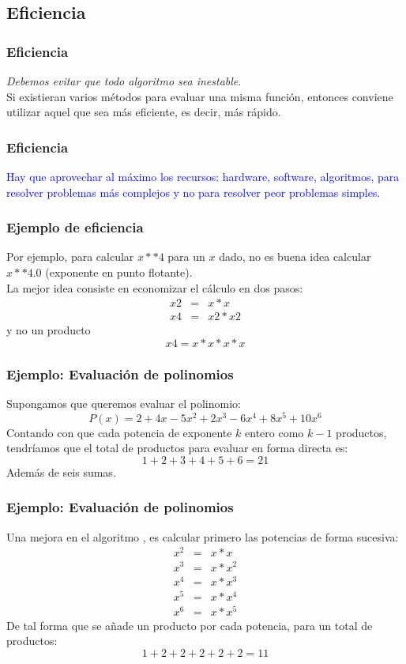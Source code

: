 \subsection{Eficiencia}
\begin{frame}
\frametitle{Eficiencia}
\emph{Debemos evitar que todo algoritmo sea inestable}. 
\\
\bigskip
Si existieran varios métodos para evaluar una misma función, entonces conviene utilizar aquel que sea más eficiente, es decir, más rápido.
\end{frame}
\begin{frame}
\frametitle{Eficiencia}
\textcolor{blue}{Hay que aprovechar al máximo los recursos: hardware, software, algoritmos, para resolver problemas más complejos y no para resolver peor problemas simples.}
\end{frame}
\begin{frame}
\frametitle{Ejemplo de eficiencia}
Por ejemplo, para calcular $x**4$ para un $x$ dado, no es buena idea calcular $x**4.0$ (exponente en punto flotante).
\\
\bigskip
\pause
La mejor idea consiste en economizar el cálculo en dos pasos:
\begin{eqnarray*}
x2 &=& x*x \\
x4 &=& x2*x2
\end{eqnarray*}
y no un producto 
\[ x4=x*x*x*x \]
\end{frame}
\begin{frame}
\frametitle{Ejemplo: Evaluación de polinomios}
Supongamos que queremos evaluar el polinomio:
\[ P(x) = 2 + 4x - 5 x^{2} + 2 x^{3} - 6 x^{4} + 8 x^{5} + 10 x^{6}\]
\pause
Contando con que cada potencia de exponente $k$ entero como $k-1$ productos, tendríamos que el total de productos para evaluar en forma directa es:
\[ 1+2+3+4+5+6=21\]
Además de seis sumas.
\end{frame}
\begin{frame}
\frametitle{Ejemplo: Evaluación de polinomios}
Una mejora en el algoritmo , es calcular primero las potencias de forma sucesiva:
\begin{eqnarray*}
x^{2} & = & x*x \\
x^{3} & = & x*x^{2} \\
x^{4} & = & x*x^{3} \\
x^{5} & = & x*x^{4} \\
x^{6} & = & x*x^{5}
\end{eqnarray*}
De tal forma que se añade un producto por cada potencia, para un total de productos:
\[1+2+2+2+2+2=11\]
\end{frame}
